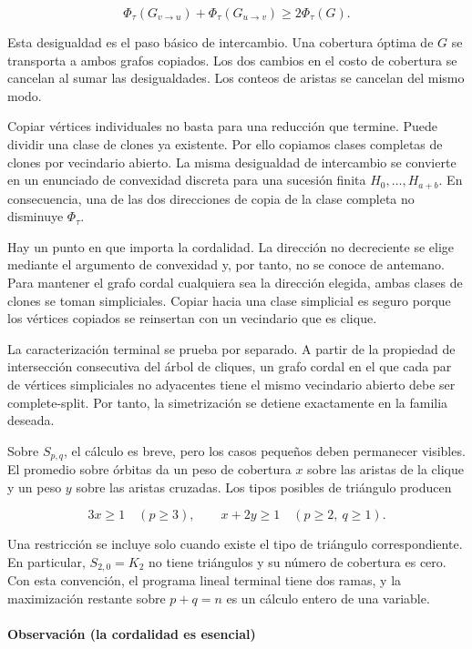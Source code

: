 \documentclass[
  spanish,
  11pt,
  a4paper,
]{article}
\begin{document}
\[
\Phi_\tau(G_{v\to u})
+
\Phi_\tau(G_{u\to v})
\ge
2\Phi_\tau(G).
\]

Esta desigualdad es el paso básico de intercambio. Una cobertura óptima de \(G\) se transporta a ambos grafos copiados. Los dos cambios en el costo de cobertura se cancelan al sumar las desigualdades. Los conteos de aristas se cancelan del mismo modo.

Copiar vértices individuales no basta para una reducción que termine. Puede dividir una clase de clones ya existente. Por ello copiamos clases completas de clones por vecindario abierto. La misma desigualdad de intercambio se convierte en un enunciado de convexidad discreta para una sucesión finita \(H_0,\ldots,H_{a+b}\). En consecuencia, una de las dos direcciones de copia de la clase completa no disminuye \(\Phi_\tau\).

Hay un punto en que importa la cordalidad. La dirección no decreciente se elige mediante el argumento de convexidad y, por tanto, no se conoce de antemano. Para mantener el grafo cordal cualquiera sea la dirección elegida, ambas clases de clones se toman simpliciales. Copiar hacia una clase simplicial es seguro porque los vértices copiados se reinsertan con un vecindario que es clique.

La caracterización terminal se prueba por separado. A partir de la propiedad de intersección consecutiva del árbol de cliques, un grafo cordal en el que cada par de vértices simpliciales no adyacentes tiene el mismo vecindario abierto debe ser complete-split. Por tanto, la simetrización se detiene exactamente en la familia deseada.

Sobre \(S_{p,q}\), el cálculo es breve, pero los casos pequeños deben permanecer visibles. El promedio sobre órbitas da un peso de cobertura \(x\) sobre las aristas de la clique y un peso \(y\) sobre las aristas cruzadas. Los tipos posibles de triángulo producen

\[
3x\ge1
\quad(p\ge3),
\qquad
x+2y\ge1
\quad(p\ge2,\ q\ge1).
\]

Una restricción se incluye solo cuando existe el tipo de triángulo correspondiente. En particular, \(S_{2,0}=K_2\) no tiene triángulos y su número de cobertura es cero. Con esta convención, el programa lineal terminal tiene dos ramas, y la maximización restante sobre \(p+q=n\) es un cálculo entero de una variable.

\paragraph{Observación (la cordalidad es esencial)}\label{observaciuxf3n-la-cordalidad-es-esencial}
\end{document}
